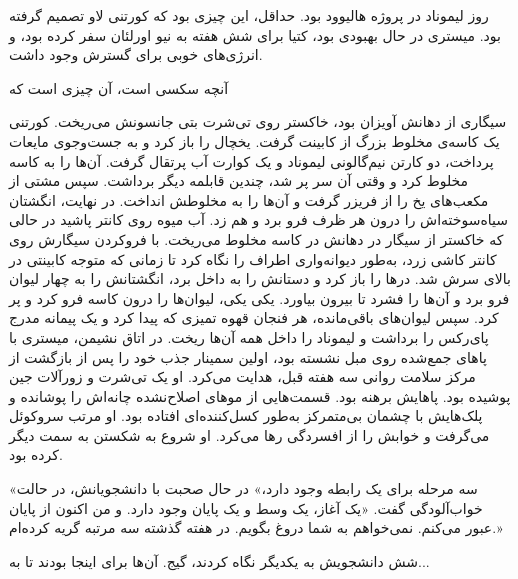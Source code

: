 روز لیموناد در پروژه هالیوود بود. حداقل، این چیزی بود که کورتنی  
لاو تصمیم گرفته بود. میستری در حال بهبودی بود، کتیا برای شش هفته به نیو اورلئان سفر کرده بود،  
و انرژی‌های خوبی برای گسترش وجود داشت.

آنچه سکسی است، آن چیزی است که

سیگاری از دهانش آویزان بود، خاکستر روی تی‌شرت بتی  
جانسونش می‌ریخت. کورتنی یک کاسه‌ی مخلوط بزرگ از کابینت گرفت.  
یخچال را باز کرد و به جست‌وجوی مایعات پرداخت،  
دو کارتن نیم‌گالونی لیموناد و یک کوارت آب پرتقال گرفت.  
آن‌ها را به کاسه مخلوط کرد و وقتی آن سر پر شد،  
چندین قابلمه دیگر برداشت. سپس مشتی از مکعب‌های یخ را از فریزر  
گرفت و آن‌ها را به مخلوطش انداخت. در نهایت، انگشتان سیاه‌سوخته‌اش را  
درون هر ظرف فرو برد و هم زد.  
آب میوه روی کانتر پاشید در حالی که خاکستر از سیگار در دهانش  
در کاسه مخلوط می‌ریخت.  
با فروکردن سیگارش روی کانتر کاشی زرد،  
به‌طور دیوانه‌واری اطراف را نگاه کرد تا زمانی که متوجه کابینتی در بالای سرش شد.  
درها را باز کرد و دستانش را به داخل برد، انگشتانش را  
به چهار لیوان فرو برد و آن‌ها را فشرد تا بیرون بیاورد.  
یکی یکی، لیوان‌ها را درون کاسه فرو کرد و پر کرد.  
سپس لیوان‌های باقی‌مانده، هر فنجان قهوه تمیزی که پیدا کرد  
و یک پیمانه مدرج پای‌رکس را‌ برداشت و لیموناد را داخل همه آن‌ها ریخت.  
در اتاق نشیمن، میستری با پاهای جمع‌شده روی مبل نشسته بود،  
اولین سمینار جذب خود را پس از بازگشت از مرکز سلامت روانی سه  
هفته قبل، هدایت می‌کرد. او یک تی‌شرت و زورآلات جین پوشیده بود. پاهایش برهنه بود.  
قسمت‌هایی از موهای اصلاح‌نشده چانه‌اش را پوشانده و پلک‌هایش  
با چشمان بی‌متمرکز به‌طور کسل‌کننده‌ای افتاده بود. او مرتب سروکوئل  
می‌گرفت و خوابش را از افسردگی رها می‌کرد. او شروع به شکستن  
به سمت دیگر کرده بود.

«سه مرحله برای یک رابطه وجود دارد،» در حال  
صحبت با دانشجویانش، در حالت خواب‌آلودگی گفت. «یک آغاز،  
یک وسط و یک پایان وجود دارد. و من اکنون از پایان عبور می‌کنم.  
نمی‌خواهم به شما دروغ بگویم. در هفته گذشته سه مرتبه  
گریه کرده‌ام.»

شش دانشجویش به یکدیگر نگاه کردند، گیج. آن‌ها برای اینجا بودند تا به...